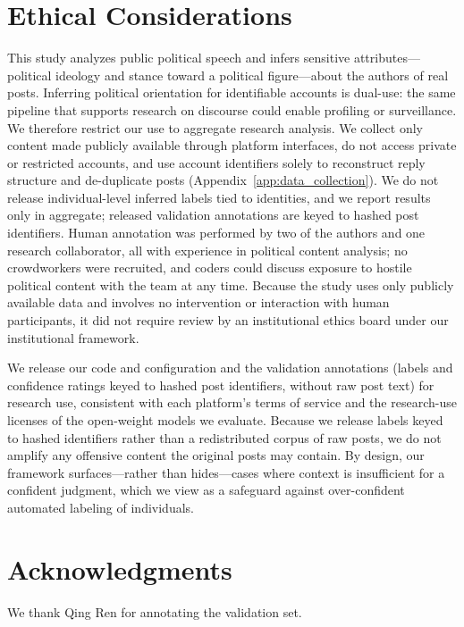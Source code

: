 \documentclass[11pt]{article}
\begin{document}
\section*{Ethical Considerations}

This study analyzes public political speech and infers sensitive attributes---political ideology and stance toward a political figure---about the authors of real posts. Inferring political orientation for identifiable accounts is dual-use: the same pipeline that supports research on discourse could enable profiling or surveillance. We therefore restrict our use to aggregate research analysis. We collect only content made publicly available through platform interfaces, do not access private or restricted accounts, and use account identifiers solely to reconstruct reply structure and de-duplicate posts (Appendix~\ref{app:data_collection}). We do not release individual-level inferred labels tied to identities, and we report results only in aggregate; released validation annotations are keyed to hashed post identifiers. Human annotation was performed by two of the authors and one research collaborator, all with experience in political content analysis; no crowdworkers were recruited, and coders could discuss exposure to hostile political content with the team at any time. Because the study uses only publicly available data and involves no intervention or interaction with human participants, it did not require review by an institutional ethics board under our institutional framework.

We release our code and configuration and the validation annotations (labels and confidence ratings keyed to hashed post identifiers, without raw post text) for research use, consistent with each platform's terms of service and the research-use licenses of the open-weight models we evaluate. Because we release labels keyed to hashed identifiers rather than a redistributed corpus of raw posts, we do not amplify any offensive content the original posts may contain. By design, our framework surfaces---rather than hides---cases where context is insufficient for a confident judgment, which we view as a safeguard against over-confident automated labeling of individuals.

\section*{Acknowledgments}

We thank Qing Ren for annotating the validation set.
\end{document}
